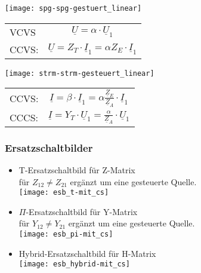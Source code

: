 \begin{mdframed}[style=exercise,frametitle=Linear]
    \begin{center}
        \texttt{[image: spg-spg-gestuert\_linear]}\\
    \begin{tabular}{l c}
        VCVS& $\underline{U}=\alpha\cdot \underline{U}_1$\\
        CCVS:& $\underline{U}=Z_T\cdot \underline{I}_1 = \alpha Z_E\cdot \underline{I}_1 $\\
    \end{tabular}
    \end{center}
    \begin{center}
        \texttt{[image: strm-strm-gesteuert\_linear]}\\
    \begin{tabular}{l c}
        CCVS:& $\underline{I}=\beta\cdot \underline{I}_1 = \alpha \frac{\underline{Z}_E}{\underline{Z}_{A}}\cdot \underline{I}_1$\\
        CCCS:& $\underline{I}=Y_T\cdot \underline{U}_1 = \frac{\alpha}{\underline{Z}_{A}}\cdot \underline{U}_1$\\
    \end{tabular}
    \end{center}
\end{mdframed}
\subsubsection{Ersatzschaltbilder}
\begin{itemize}
    \item T-Ersatzschaltbild für Z-Matrix\\
        für $Z_{12} \neq Z_{21}$ ergänzt um eine gesteuerte Quelle.\\
        \centering\texttt{[image: esb\_t-mit\_cs]}

        \raggedright
    \item $\Pi$-Ersatzschaltbild für Y-Matrix\\
        für $Y_{12} \neq Y_{21}$ ergänzt um eine gesteuerte Quelle.\\
        \centering\texttt{[image: esb\_pi-mit\_cs]}

        \raggedright
    \item  Hybrid-Ersatzschaltbild für H-Matrix\\
        \centering\texttt{[image: esb\_hybrid-mit\_cs]}
\end{itemize}

